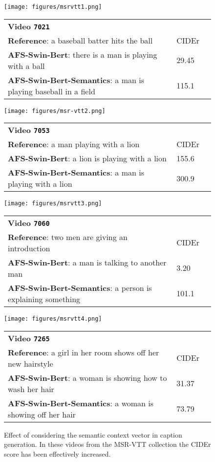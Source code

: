 \documentclass[runningheads,table]{llncs}
\begin{document}
\begin{figure*}[ht]
   
    {
    \texttt{[image: figures/msrvtt1.png]} 
    }
\small{
        \begin{tabular}{lll}
        \textbf{Video
        \texttt{7021}}\\
        \textbf{Reference}: a baseball batter hits the ball & CIDEr \\
        \textbf{AFS-Swin-Bert}: there is a man is playing with a ball & 29.45 \\
        \textbf{AFS-Swin-Bert-Semantics}: a man is playing baseball in a field & 115.1 \\
        \end{tabular}
        }
       \newline
    {
    \texttt{[image: figures/msr-vtt2.png]} 
    }
   
        \small{
        \begin{tabular}{lll}
        \textbf{Video
        \texttt{7053}}\\
        \textbf{Reference}: a man playing with a lion & CIDEr \\
        \textbf{AFS-Swin-Bert}: a lion is playing with a lion & 155.6 \\
        \textbf{AFS-Swin-Bert-Semantics}: a man is playing with a lion & 300.9 \\
        \end{tabular}
        }
    \newline
    {
    \texttt{[image: figures/msrvtt3.png]} 
    }
\small{
        \begin{tabular}{lll}
        \textbf{Video
        \texttt{7060}}\\
        \textbf{Reference}: two men are giving an introduction & CIDEr \\
         \textbf{AFS-Swin-Bert}: a man is talking to another man & 3.20 \\
        \textbf{AFS-Swin-Bert-Semantics}: a person is explaining something & 101.1\\
        \end{tabular}
        }
        \newline
    {
    \texttt{[image: figures/msrvtt4.png]} 
    }
\small{
        \begin{tabular}{lll}
        \textbf{Video
        \texttt{7265}}\\
        \textbf{Reference}: a girl in her room shows off her new hairstyle & CIDEr \\
        \textbf{AFS-Swin-Bert}: a woman is showing how to wash her hair & 31.37 \\
        \textbf{AFS-Swin-Bert-Semantics}: a woman is showing off her hair & 73.79 \\
        
        \end{tabular}
    }
      
    \caption{Effect of considering the semantic context vector in caption generation. In these videos from the MSR-VTT collection the CIDEr score has been effectively increased. 
}\label{fig:msrvtt-output}
\end{figure*}
\end{document}
